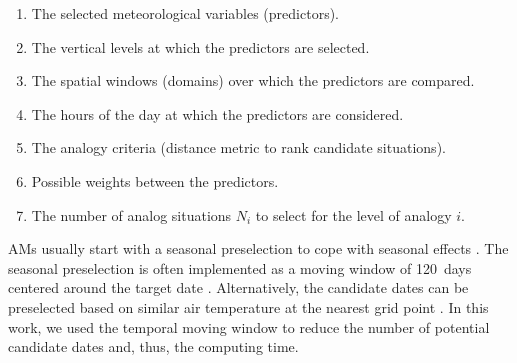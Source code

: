 \documentclass[draft]{agujournal2019}
\begin{document}
\begin{enumerate}		
	\item The selected meteorological variables (predictors).
	\item The vertical levels at which the predictors are selected.
	\item The spatial windows (domains) over which the predictors are compared.
	\item The hours of the day at which the predictors are considered.
	\item The analogy criteria (distance metric to rank candidate situations).
	\item Possible weights between the predictors.
	\item The number of analog situations $N_{i}$ to select for the level of analogy $i$.
\end{enumerate}

AMs usually start with a seasonal preselection to cope with seasonal effects \cite{Lorenz1969}. The seasonal preselection is often implemented as a moving window of 120~days centered around the target date \cite{Bontron2004, Marty2012, Horton2012, BenDaoud2016}. Alternatively, the candidate dates can be preselected based on similar air temperature at the nearest grid point \cite[methods RM5 and RM6 in Table \ref{table:methods}]{BenDaoud2016}. In this work, we used the temporal moving window to reduce the number of potential candidate dates and, thus, the computing time.
\end{document}
